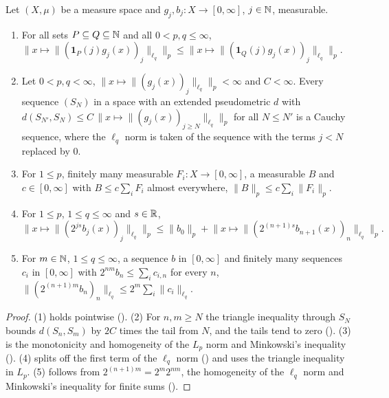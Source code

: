 \begin{lemma}
\label{lem:mixed-norm-tools}
\leanok
{}
Let $(X, \mu)$ be a measure space and $g_j, b_j \colon X \to [0, \infty]$, $j \in \mathbb{N}$, measurable.
\begin{enumerate}
  \item For all sets $P \subseteq Q \subseteq \mathbb{N}$ and all $0 < p, q \leq \infty$,
    $\bigl\| x \mapsto \|(\mathbf 1_P(j) g_j(x))_j\|_{\ell_q} \bigr\|_p
    \leq \bigl\| x \mapsto \|(\mathbf 1_Q(j) g_j(x))_j\|_{\ell_q} \bigr\|_p$.
  \item Let $0 < p, q < \infty$, $\bigl\| x \mapsto \|(g_j(x))_j\|_{\ell_q} \bigr\|_p < \infty$
    and $C < \infty$. Every sequence $(S_N)$ in a space with an extended pseudometric $d$ with
    $d(S_{N'}, S_N) \leq C \, \bigl\| x \mapsto \|(g_j(x))_{j \geq N}\|_{\ell_q} \bigr\|_p$ for
    all $N \leq N'$ is a Cauchy sequence, where the $\ell_q$ norm is taken of the sequence with
    the terms $j < N$ replaced by $0$.
  \item For $1 \leq p$, finitely many measurable $F_i \colon X \to [0, \infty]$, a measurable
    $B$ and $c \in [0, \infty]$ with $B \leq c \sum_i F_i$ almost everywhere,
    $\|B\|_p \leq c \sum_i \|F_i\|_p$.
  \item For $1 \leq p$, $1 \leq q \leq \infty$ and $s \in \mathbb{R}$,
    \[
      \bigl\| x \mapsto \|(2^{js} b_j(x))_j\|_{\ell_q} \bigr\|_p \leq \|b_0\|_p
      + \bigl\| x \mapsto \|(2^{(n+1)s} b_{n+1}(x))_n\|_{\ell_q} \bigr\|_p .
    \]
  \item For $m \in \mathbb{N}$, $1 \leq q \leq \infty$, a sequence $b$ in $[0, \infty]$ and finitely
    many sequences $c_i$ in $[0, \infty]$ with $2^{nm} b_n \leq \sum_i c_{i,n}$ for every $n$,
    $\|(2^{(n+1)m} b_n)_n\|_{\ell_q} \leq 2^m \sum_i \|c_i\|_{\ell_q}$.
\end{enumerate}
\end{lemma}

\begin{proof}
\leanok
(1) holds pointwise (). (2) For $n, m \geq N$ the triangle inequality
through $S_N$ bounds $d(S_n, S_m)$ by $2 C$ times the tail from $N$, and the tails tend to zero
(). (3) is the
monotonicity and homogeneity of the $L_p$ norm and Minkowski's inequality
(). (4) splits off the first term of the $\ell_q$ norm
() and uses the triangle inequality in $L_p$. (5) follows from
$2^{(n+1)m} = 2^m 2^{nm}$, the homogeneity of the $\ell_q$ norm and Minkowski's inequality for
finite sums ().
\end{proof}

